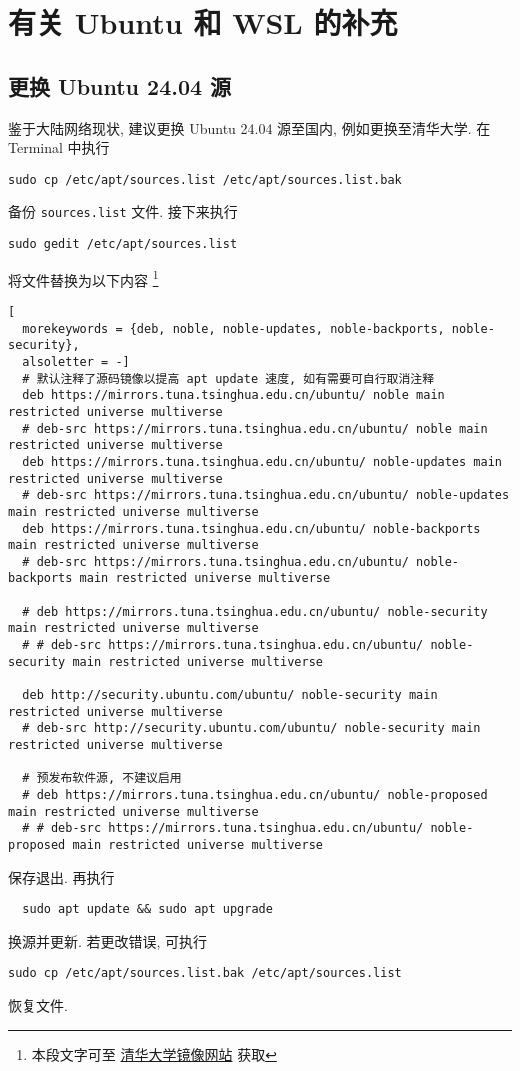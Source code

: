 
\chapter{有关 Ubuntu 和 WSL 的补充}\label{chp:appendix:addition}

\section{更换 Ubuntu 24.04 源}\label{sec:addition:source}

鉴于大陆网络现状,
建议更换 Ubuntu 24.04 源至国内,
例如更换至清华大学.
在 \textsf{Terminal} 中执行
\begin{lstlisting}[deletekeywords = apt]
  sudo cp /etc/apt/sources.list /etc/apt/sources.list.bak
\end{lstlisting}
备份 \texttt{sources.list} 文件.
接下来执行
\begin{lstlisting}[deletekeywords = apt]
  sudo gedit /etc/apt/sources.list
\end{lstlisting}
将文件替换为以下内容%
\footnote{本段文字可至%
  \href{https://mirrors.tuna.tsinghua.edu.cn/help/ubuntu/}{清华大学镜像网站}%
  获取}
\begin{lstlisting}[
  morekeywords = {deb, noble, noble-updates, noble-backports, noble-security},
  alsoletter = -]
  # 默认注释了源码镜像以提高 apt update 速度, 如有需要可自行取消注释
  deb https://mirrors.tuna.tsinghua.edu.cn/ubuntu/ noble main restricted universe multiverse
  # deb-src https://mirrors.tuna.tsinghua.edu.cn/ubuntu/ noble main restricted universe multiverse
  deb https://mirrors.tuna.tsinghua.edu.cn/ubuntu/ noble-updates main restricted universe multiverse
  # deb-src https://mirrors.tuna.tsinghua.edu.cn/ubuntu/ noble-updates main restricted universe multiverse
  deb https://mirrors.tuna.tsinghua.edu.cn/ubuntu/ noble-backports main restricted universe multiverse
  # deb-src https://mirrors.tuna.tsinghua.edu.cn/ubuntu/ noble-backports main restricted universe multiverse

  # deb https://mirrors.tuna.tsinghua.edu.cn/ubuntu/ noble-security main restricted universe multiverse
  # # deb-src https://mirrors.tuna.tsinghua.edu.cn/ubuntu/ noble-security main restricted universe multiverse

  deb http://security.ubuntu.com/ubuntu/ noble-security main restricted universe multiverse
  # deb-src http://security.ubuntu.com/ubuntu/ noble-security main restricted universe multiverse

  # 预发布软件源, 不建议启用
  # deb https://mirrors.tuna.tsinghua.edu.cn/ubuntu/ noble-proposed main restricted universe multiverse
  # # deb-src https://mirrors.tuna.tsinghua.edu.cn/ubuntu/ noble-proposed main restricted universe multiverse
\end{lstlisting}
保存退出.
再执行
\begin{lstlisting}
  sudo apt update && sudo apt upgrade
\end{lstlisting}
换源并更新.
若更改错误,
可执行
\begin{lstlisting}[deletekeywords = apt]
  sudo cp /etc/apt/sources.list.bak /etc/apt/sources.list
\end{lstlisting}
恢复文件.

